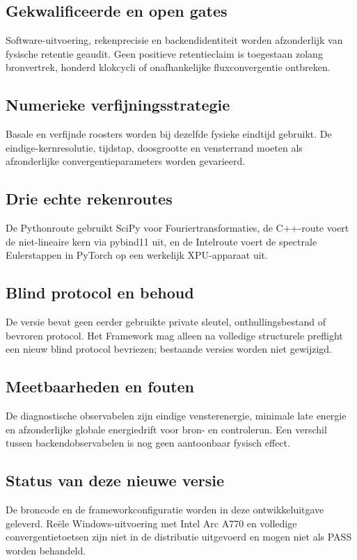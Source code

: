 \documentclass[10pt,a4paper]{article}
\begin{document}
\subsection{Gekwalificeerde en open gates}
Software-uitvoering, rekenprecisie en backendidentiteit worden afzonderlijk van fysische retentie geaudit. Geen positieve retentieclaim is toegestaan zolang bronvertrek, honderd klokcycli of onafhankelijke fluxconvergentie ontbreken.
\subsection{Numerieke verfijningsstrategie}
Basale en verfijnde roosters worden bij dezelfde fysieke eindtijd gebruikt. De eindige-kernresolutie, tijdstap, doosgrootte en vensterrand moeten als afzonderlijke convergentieparameters worden gevarieerd.
\subsection{Drie echte rekenroutes}
De Pythonroute gebruikt SciPy voor Fouriertransformaties, de C++-route voert de niet-lineaire kern via pybind11 uit, en de Intelroute voert de spectrale Eulerstappen in PyTorch op een werkelijk XPU-apparaat uit.
\subsection{Blind protocol en behoud}
De versie bevat geen eerder gebruikte private sleutel, onthullingsbestand of bevroren protocol. Het Framework mag alleen na volledige structurele preflight een nieuw blind protocol bevriezen; bestaande versies worden niet gewijzigd.
\subsection{Meetbaarheden en fouten}
De diagnostische observabelen zijn eindige vensterenergie, minimale late energie en afzonderlijke globale energiedrift voor bron- en controlerun. Een verschil tussen backendobservabelen is nog geen aantoonbaar fysisch effect.
\subsection{Status van deze nieuwe versie}
De broncode en de frameworkconfiguratie worden in deze ontwikkeluitgave geleverd. Reële Windows-uitvoering met Intel Arc A770 en volledige convergentietoetsen zijn niet in de distributie uitgevoerd en mogen niet als PASS worden behandeld.
\end{document}
